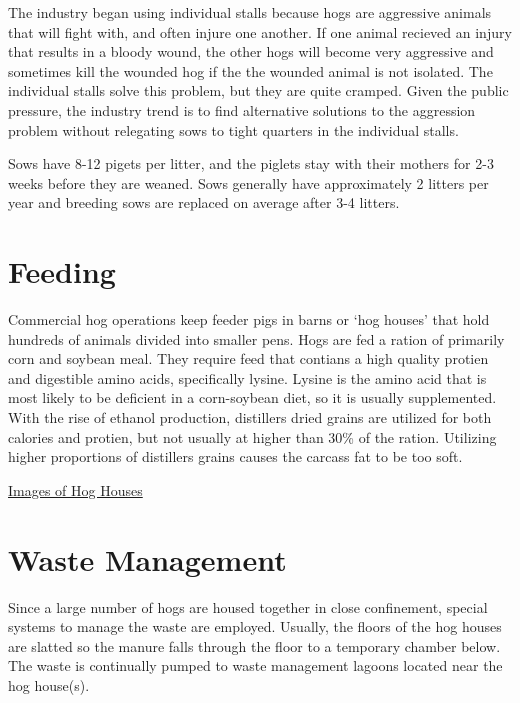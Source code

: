 \documentclass[]{book}
\theoremstyle{definition}
\theoremstyle{definition}
\theoremstyle{remark}
\begin{document}
The industry began using individual stalls because hogs are aggressive
animals that will fight with, and often injure one another. If one
animal recieved an injury that results in a bloody wound, the other hogs
will become very aggressive and sometimes kill the wounded hog if the
the wounded animal is not isolated. The individual stalls solve this
problem, but they are quite cramped. Given the public pressure, the
industry trend is to find alternative solutions to the aggression
problem without relegating sows to tight quarters in the individual
stalls.

Sows have 8-12 pigets per litter, and the piglets stay with their
mothers for 2-3 weeks before they are weaned. Sows generally have
approximately 2 litters per year and breeding sows are replaced on
average after 3-4 litters.

\section{Feeding}\label{feeding}

Commercial hog operations keep feeder pigs in barns or `hog houses' that
hold hundreds of animals divided into smaller pens. Hogs are fed a
ration of primarily corn and soybean meal. They require feed that
contians a high quality protien and digestible amino acids, specifically
lysine. Lysine is the amino acid that is most likely to be deficient in
a corn-soybean diet, so it is usually supplemented. With the rise of
ethanol production, distillers dried grains are utilized for both
calories and protien, but not usually at higher than 30\% of the ration.
Utilizing higher proportions of distillers grains causes the carcass fat
to be too soft.

\href{https://www.google.com/search?q=hog+houses\&espv=2\&biw=1920\&bih=1075\&source=lnms\&tbm=isch\&sa=X\&ved=0CAYQ_AUoAWoVChMIiLHMk_mayQIVBtgeCh3Jyweb}{Images
of Hog Houses}

\section{Waste Management}\label{waste-management}

Since a large number of hogs are housed together in close confinement,
special systems to manage the waste are employed. Usually, the floors of
the hog houses are slatted so the manure falls through the floor to a
temporary chamber below. The waste is continually pumped to waste
management lagoons located near the hog house(s).
\end{document}
